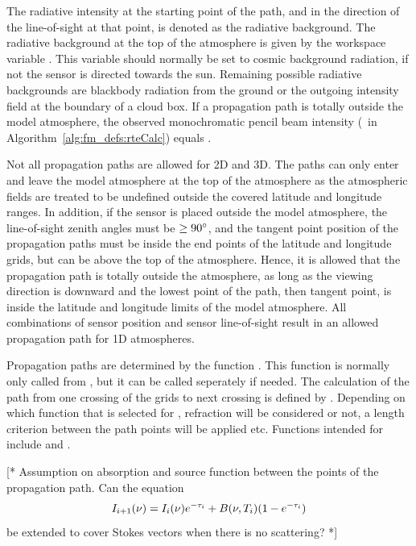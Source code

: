 The radiative intensity at the starting point of the path, and in the
direction of the line-of-sight at that point, is denoted as the
radiative background. The radiative background at the top of the
atmosphere is given by the workspace variable . This
variable should normally be set to cosmic background radiation, if
not the sensor is directed towards the sun. Remaining possible
radiative backgrounds are blackbody radiation from the ground or the
outgoing intensity field at the boundary of a cloud box. If a
propagation path is totally outside the model atmosphere, the
observed monochromatic pencil beam intensity (\MpiVct\ in
Algorithm~\ref{alg:fm_defs:rteCalc}) equals .

Not all propagation paths are allowed for 2D and 3D. The paths can
only enter and leave the model atmosphere at the top of the atmosphere
as the atmospheric fields are treated to be undefined outside the
covered latitude and longitude ranges. In addition, if the sensor is
placed outside the model atmosphere, the line-of-sight zenith angles
must be $\geq90^\circ$, and the tangent point position of the
propagation paths must be inside the end points of the latitude and
longitude grids, but can be above the top of the atmosphere. Hence, it
is allowed that the propagation path is totally outside the
atmosphere, as long as the viewing direction is downward and the
lowest point of the path, then tangent point, is inside the latitude
and longitude limits of the model atmosphere. All combinations of
sensor position and sensor line-of-sight result in an allowed
propagation path for 1D atmospheres. 

Propagation paths are determined by the function .
This function is normally only called from , but it
can be called seperately if needed. The calculation of the path from
one crossing of the grids to next crossing is defined by
. Depending on which function that is
selected for , refraction will be
considered or not, a length criterion between the path points will be
applied etc. Functions intended for 
include  and
.


\label{sec:fm_defs:solverte}

[* Assumption on absorption and source function between the points of
the propagation path. Can the equation 
\begin{equation}
  I_{i+1}(\nu) = I_i(\nu)e^{-\tau_{i}} + B(\nu,T_{i})(1-e^{-\tau_{i}})
\end{equation}
be extended to cover Stokes vectors when there is no scattering? *]



